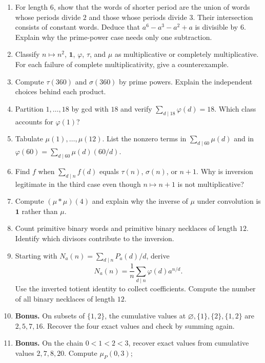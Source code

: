 \begin{exercisebox}
\begin{enumerate}
  square $1$ modulo $8$, even though $\varphi(8)=4$.
  \item For length $6$, show that the words of shorter period are
  the union of words whose periods divide $2$ and those whose periods
  divide $3$. Their intersection consists of constant words. Deduce
  that $a^6-a^3-a^2+a$ is divisible by $6$. Explain why the prime-power
  case needs only one subtraction. 
  \item Classify $n\mapsto n^2$, $\mathbf{1}$, $\varphi$, $\tau$,
  and $\mu$ as multiplicative or completely multiplicative.
  For each failure of complete multiplicativity, give a counterexample.
  \item Compute $\tau(360)$ and $\sigma(360)$ by prime powers.
  Explain the independent choices behind each product. 
  \item Partition $1,\ldots,18$ by gcd with $18$ and verify
  $\sum_{d\mid18}\varphi(d)=18$. Which class accounts for
  $\varphi(1)$? 
  \item Tabulate $\mu(1),\ldots,\mu(12)$. List the nonzero terms
  in $\sum_{d\mid60}\mu(d)$ and in
  $\varphi(60)=\sum_{d\mid60}\mu(d)(60/d)$. 
  \item Find $f$ when $\sum_{d\mid n}f(d)$ equals $\tau(n)$,
  $\sigma(n)$, or $n+1$. Why is inversion legitimate in the third
  case even though $n\mapsto n+1$ is not multiplicative?
  \item Compute $(\mu*\mu)(4)$ and explain why the inverse of
  $\mu$ under convolution is $\mathbf{1}$ rather than $\mu$.
  \item Count primitive binary words and primitive binary necklaces
  of length $12$. Identify which divisors contribute to the inversion.
  \item Starting with $N_a(n)=\sum_{d\mid n}P_a(d)/d$, derive
  \[
    N_a(n)=\frac1n\sum_{d\mid n}\varphi(d)a^{n/d}.
  \]
  Use the inverted totient identity to collect coefficients.
  Compute the number of all binary necklaces of length $12$.
  \item \textbf{Bonus.} On subsets of $\{1,2\}$, the cumulative
  values at $\varnothing,\{1\},\{2\},\{1,2\}$ are $2,5,7,16$.
  Recover the four exact values and check by summing again.
  \item \textbf{Bonus.} On the chain $0<1<2<3$, recover exact
  values from cumulative values $2,7,8,20$. Compute $\mu_P(0,3)$;

\end{enumerate}
\end{exercisebox}

